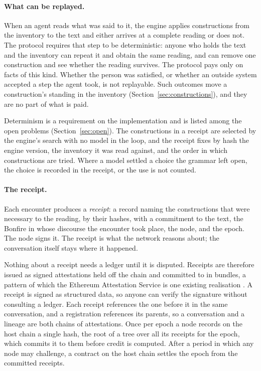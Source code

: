\paragraph{What can be replayed.} When an agent reads what was said to it, the engine applies constructions from
the inventory to the text and either arrives at a complete reading or does not. The protocol requires that step to
be deterministic: anyone who holds the text and the inventory can repeat it and obtain the same reading, and can
remove one construction and see whether the reading survives. The protocol pays only on facts of this kind.
Whether the person was satisfied, or whether an outside system accepted a step the agent took, is not replayable.
Such outcomes move a construction's standing in the inventory (Section~\ref{sec:constructions}), and they are no
part of what is paid.

Determinism is a requirement on the implementation and is listed among the open problems
(Section~\ref{sec:open}). The constructions in a receipt are selected by the engine's search with no model in the
loop, and the receipt fixes by hash the engine version, the inventory it was read against, and the order in which
constructions are tried. Where a model settled a choice the grammar left open, the choice is recorded in the
receipt, or the use is not counted.

\paragraph{The receipt.} Each encounter produces a \emph{receipt}: a record naming the constructions that were
necessary to the reading, by their hashes, with a commitment to the text, the Bonfire in whose discourse the
encounter took place, the node, and the epoch. The node signs it. The receipt is what the network reasons about;
the conversation itself stays where it happened.

Nothing about a receipt needs a ledger until it is disputed. Receipts are therefore issued as signed attestations
held off the chain and committed to in bundles, a pattern of which the Ethereum Attestation Service is one existing
realisation \citep{eas2024contracts}. A receipt is signed as structured data, so anyone can verify the signature
without consulting a ledger. Each receipt references the one before it in the same conversation, and a
registration references its parents, so a conversation and a lineage are both chains of attestations. Once per
epoch a node records on the host chain a single hash, the root of a tree over all its receipts for the epoch, which
commits it to them before credit is computed. After a period in which any node may challenge, a contract on the
host chain settles the epoch from the committed receipts.

